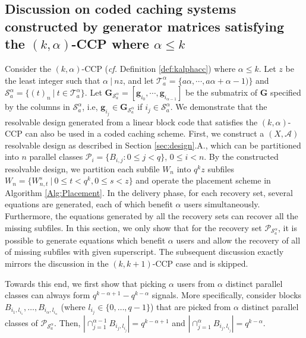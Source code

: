 \documentclass[journal,twocolumn]{IEEEtran}
\theoremstyle{definition}
\newtheorem{definition}{Definition}
\newcommand{\calA}{\mathcal{A}}
\newcommand{\calP}{\mathcal{P}}
\newcommand{\calS}{\mathcal{S}}
\newcommand{\calT}{\mathcal{T}}
\newcommand{\bfg}{\mathbf{g}}
\newcommand{\bfG}{\mathbf{G}}
\newcommand{\aditya}[1]{\marginpar{+}{\bf Aditya's remark}: {\em #1}}
\begin{document}
\subsection{Discussion on coded caching systems constructed by generator matrices satisfying the $(k,\alpha)$-CCP where $\alpha \leq k$}
\label{sec:kalpha_ccp_matrices}
Consider the $(k,\alpha)$-CCP ({\it cf.} Definition \ref{def:kalphacc}) where $\alpha\le k$. Let $z$ be the least integer such that $\alpha~|~nz$, and let $\calT^\alpha_a=\{a\alpha,\cdots,a\alpha+\alpha-1)\}$ and $\calS^\alpha_a=\{(t)_n~|~t\in \calT^\alpha_a\}$. Let $\bfG_{\calS^\alpha_a}=[\bfg_{i_0},\cdots,\bfg_{i_{\alpha-1}}]$ be the submatrix of $\bfG$ specified by the columns in $\calS^\alpha_a$, i.e,  $\bfg_{i_j} \in \bfG_{\calS^\alpha_a}$ if $i_j\in \calS^\alpha_a$.
We demonstrate that the resolvable design generated from a linear block code that satisfies the $(k,\alpha)$-CCP can also be used in a coded caching scheme. First, we construct a $(X,\calA)$ resolvable design as described in Section \ref{sec:design}.A., which can be partitioned into $n$ parallel classes $\calP_i=\{B_{i,j}: 0\le j<q\}$, $0\le i<n$. By the constructed resolvable design, we partition each subfile $W_n$ into $q^kz$ subfiles $W_n=\{W_{n,t}^s~|~0\le t< q^k, 0\le s< z\}$ and operate the placement scheme in Algorithm \ref{Alg:Placement}. In the delivery phase, for each recovery set, several equations are generated, each of which benefit $\alpha$ users simultaneously. Furthermore, the equations generated by all the recovery sets can recover all the missing subfiles. In this section, we only show that for the recovery set $\calP_{\calS^\alpha_a}$, it is possible to generate equations which benefit $\alpha$ users and allow the recovery of all of missing subfiles with given superscript. The subsequent discussion exactly mirrors the discussion in the $(k,k+1)$-CCP case and is skipped.

Towards this end, we first show that picking $\alpha$ users from $\alpha$ distinct parallel classes can always form $q^{k-\alpha+1}-q^{k-\alpha}$ signals. More specifically, consider blocks $B_{i_1, l_{i_1}}, \dots, B_{i_{\alpha}, l_{i_{\alpha}}}$ (where $l_{i_j} \in \{0, \dots, q-1\}$) that are picked from $\alpha$ distinct parallel classes of $\calP_{\calS^\alpha_{a}}$. Then, $|\cap_{j=1}^{\alpha-1} B_{i_j, l_{i_j}}| = q^{k-\alpha+1}$ and $|\cap_{j=1}^\alpha B_{i_j, l_{i_j}}| = q^{k-\alpha}$.
\end{document}
